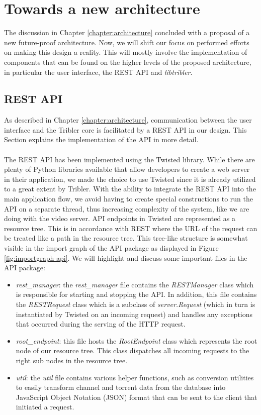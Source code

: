\chapter{Towards a new architecture}
\label{chapter:towards_new_architecture}
The discussion in Chapter \ref{chapter:architecture} concluded with a proposal of a new future-proof architecture. Now, we will shift our focus on performed efforts on making this design a reality. This will mostly involve the implementation of components that can be found on the higher levels of the proposed architecture, in particular the user interface, the REST API and \emph{libtribler}.

\section{REST API}
As described in Chapter \ref{chapter:architecture}, communication between the user interface and the Tribler core is facilitated by a REST API in our design. This Section explains the implementation of the API in more detail.\\\\
The REST API has been implemented using the Twisted library. While there are plenty of Python libraries available that allow developers to create a web server in their application, we made the choice to use Twisted since it is already utilized to a great extent by Tribler. With the ability to integrate the REST API into the main application flow, we avoid having to create special constructions to run the API on a separate thread, thus increasing complexity of the system, like we are doing with the video server. API endpoints in Twisted are represented as a resource tree. This is in accordance with REST where the URL of the request can be treated like a path in the resource tree. This tree-like structure is somewhat visible in the import graph of the API package as displayed in Figure \ref{fig:importgraph-api}. We will highlight and discuss some important files in the API package:
\begin{itemize}
	\item \emph{rest\_manager}: the \emph{rest\_manager} file contains the \emph{RESTManager} class which is responsible for starting and stopping the API. In addition, this file contains the \emph{RESTRequest} class which is a subclass of \emph{server.Request} (which in turn is instantiated by Twisted on an incoming request) and handles any exceptions that occurred during the serving of the HTTP request.
	\item \emph{root\_endpoint}: this file hosts the \emph{RootEndpoint} class which represents the root node of our resource tree. This class dispatches all incoming requests to the right sub nodes in the resource tree.
	\item \emph{util}: the \emph{util} file contains various helper functions, such as conversion utilities to easily transform channel and torrent data from the database into JavaScript Object Notation (JSON) format that can be sent to the client that initiated a request.
\end{itemize}

